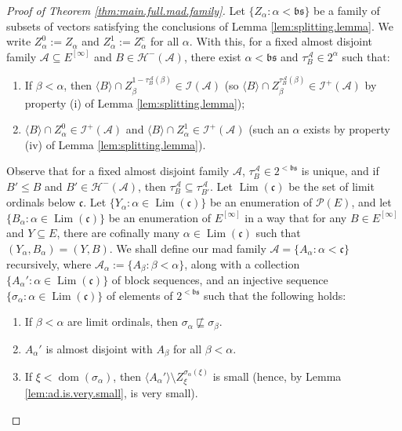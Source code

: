 \documentclass[11pt,reqno]{amsart}
\theoremstyle{plain}
\numberwithin{equation}{section}
\theoremstyle{definition}
\newcommand{\func}{\operatorname}
\renewcommand{\c}[1]{\langle #1 \rangle}
\newcommand{\Po}{\cal{P}}
\newcommand{\cal}{\mathcal}
\renewcommand{\frak}{\mathfrak}
\newcommand{\dom}{\func{dom}}
\newcommand{\A}{\cal{A}}
\renewcommand{\H}{\cal{H}}
\newcommand{\I}{\cal{I}}
\newcommand{\Lim}{\func{Lim}}
\begin{document}
\begin{proof}[Proof of Theorem \ref{thm:main.full.mad.family}]
    Let $\{Z_\alpha : \alpha < \frak{bs}\}$ be a family of subsets of vectors satisfying the conclusions of Lemma \ref{lem:splitting.lemma}. We write $Z_\alpha^0 := Z_\alpha$ and $Z_\alpha^1 := Z_\alpha^c$ for all $\alpha$. With this, for a fixed almost disjoint family $\A \subseteq E^{[\infty]}$ and $B \in \H^-(\A)$, there exist $\alpha < \frak{bs}$ and $\tau_B^\A \in 2^\alpha$ such that:
    \begin{enumerate}
        \item If $\beta < \alpha$, then $\c{B} \cap Z_\beta^{1-\tau_B^\A(\beta)} \in \I(\A)$ (so $\c{B} \cap Z_\beta^{\tau_B^\A(\beta)} \in \I^+(\A)$ by property (i) of Lemma \ref{lem:splitting.lemma});

        \item $\c{B} \cap Z_\alpha^0 \in \I^+(\A)$ and $\c{B} \cap Z_\alpha^1 \in \I^+(\A)$ (such an $\alpha$ exists by property (iv) of Lemma \ref{lem:splitting.lemma}). 
    \end{enumerate}
    Observe that for a fixed almost disjoint family $\A$, $\tau_B^\A \in 2^{<\frak{bs}}$ is unique, and if $B' \leq B$ and $B' \in \H^-(\A)$, then $\tau_B^\A \subseteq \tau_{B'}^\A$. Let $\Lim(\frak{c})$ be the set of limit ordinals below $\frak{c}$. Let $\{Y_\alpha : \alpha \in \Lim(\frak{c})\}$ be an enumeration of $\Po(E)$, and let $\{B_\alpha : \alpha \in \Lim(\frak{c})\}$ be an enumeration of $E^{[\infty]}$ in a way that for any $B \in E^{[\infty]}$ and $Y \subseteq E$, there are cofinally many $\alpha \in \Lim(\frak{c})$ such that $(Y_\alpha,B_\alpha) = (Y,B)$. We shall define our mad family $\A = \{A_\alpha : \alpha < \frak{c}\}$ recursively, where $\A_\alpha := \{A_\beta : \beta < \alpha\}$, along with a collection $\{A_\alpha' : \alpha \in \Lim(\frak{c})\}$ of block sequences, and an injective sequence $\{\sigma_\alpha : \alpha \in \Lim(\frak{c})\}$ of elements of $2^{<\frak{bs}}$ such that the following holds:
    \begin{enumerate}
        \item If $\beta < \alpha$ are limit ordinals, then $\sigma_\alpha \not\sqsubseteq \sigma_\beta$.

        \item $A_\alpha'$ is almost disjoint with $A_\beta$ for all $\beta < \alpha$.

        \item If $\xi < \dom(\sigma_\alpha)$, then $\c{A_\alpha'} \setminus Z_\xi^{\sigma_\alpha(\xi)}$ is small (hence, by Lemma \ref{lem:ad.is.very.small}, is very small).


\end{enumerate}
\end{proof}
\end{document}
